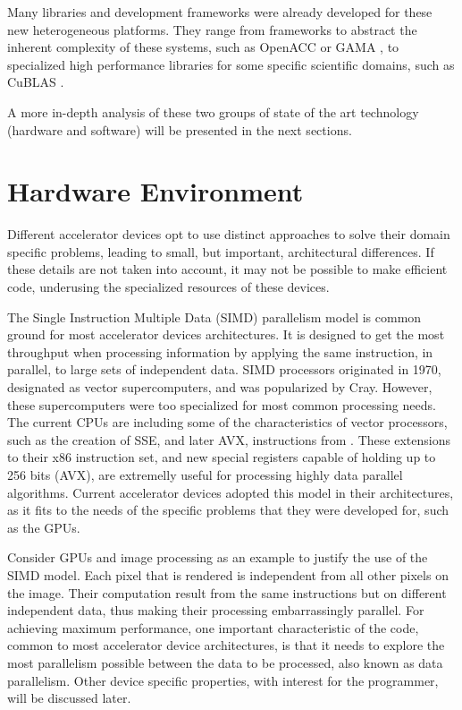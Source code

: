 Many libraries and development frameworks were already developed for these new heterogeneous platforms. They range from frameworks to abstract the inherent complexity of these systems, such as OpenACC \cite{OpenACC} or GAMA \cite{GAMA}, to specialized high performance libraries for some specific scientific domains, such as CuBLAS \cite{NVIDIA:CuBLAS}.

A more in-depth analysis of these two groups of state of the art technology (hardware and software) will be presented in the next sections.

\section{Hardware Environment}

Different accelerator devices opt to use distinct approaches to solve their domain specific problems, leading to small, but important, architectural differences. If these details are not taken into account, it may not be possible to make efficient code, underusing the specialized resources of these devices.

The Single Instruction Multiple Data (SIMD) parallelism model is common ground for most accelerator devices architectures. It is designed to get the most throughput when processing information by applying the same instruction, in parallel, to large sets of independent data. SIMD processors originated in 1970, designated as vector supercomputers, and was popularized by Cray. However, these supercomputers were too specialized for most common processing needs. The current CPUs are including some of the characteristics of vector processors, such as the creation of SSE, and later AVX, instructions from \intel. These extensions to their x86 instruction set, and new special registers capable of holding up to 256 bits (AVX), are extremelly useful for processing highly data parallel algorithms. Current accelerator devices adopted this model in their architectures, as it fits to the needs of the specific problems that they were developed for, such as the GPUs.

Consider GPUs and image processing as an example to justify the use of the SIMD model. Each pixel that is rendered is independent from all other pixels on the image. Their computation result from the same instructions but on different independent data, thus making their processing embarrassingly parallel. For achieving maximum performance, one important characteristic of the code, common to most accelerator device architectures, is that it needs to explore the most parallelism possible between the data to be processed, also known as data parallelism. Other device specific properties, with interest for the programmer, will be discussed later.

